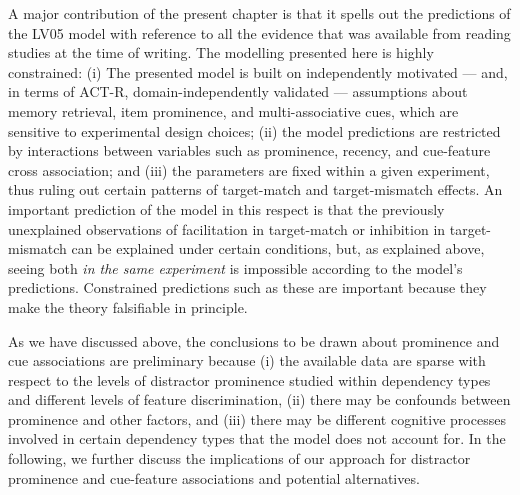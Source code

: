 \documentclass{cambridge7A}\usepackage[]{graphicx}\usepackage[]{color}
\begin{document}
A major contribution of the present chapter is that it spells out the predictions of the LV05 model with reference to all the evidence that was available from reading studies at the time of writing. The modelling presented here is highly constrained:
(i) The presented model is built on independently motivated --- and, in terms of ACT-R, domain-independently validated --- assumptions about  memory retrieval,  item prominence, and  multi-associative cues, which are sensitive to experimental design choices; (ii) the model predictions are restricted by interactions between variables such as prominence,  recency, and cue-feature cross association; and (iii) the parameters are fixed within a given experiment, thus ruling out certain patterns of target-match and target-mismatch effects. 
An important prediction of the model in this respect is that the previously unexplained observations of facilitation in target-match or inhibition in target-mismatch can be explained under certain conditions, but,  as explained above, seeing both \textit{in the same experiment} is impossible according to the model's predictions.
Constrained predictions such as these are important because they make the theory falsifiable in principle.

As we have discussed above, the conclusions to be drawn about prominence and cue associations are preliminary because (i) the available data are sparse with respect to the levels of distractor prominence studied within dependency types and different levels of feature discrimination, (ii) there may be confounds between prominence and other factors, and (iii) there may be different cognitive processes involved in certain dependency types that the model does not account for.
In the following, we further discuss the implications of our approach for distractor prominence and cue-feature associations and potential alternatives.
\end{document}
